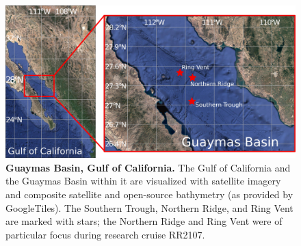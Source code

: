 \begin{figure}[!ht]
  \centering
  \includegraphics[width=\columnwidth]{figures/ops_guaymas.png}
  \caption[Guaymas Basin, Gulf of California.]{\textbf{Guaymas Basin, Gulf of California.} The Gulf of California and the Guaymas Basin within it are visualized with satellite imagery and composite satellite and open-source bathymetry (as provided by GoogleTiles). The Southern Trough, Northern Ridge, and Ring Vent are marked with stars; the Northern Ridge and Ring Vent were of particular focus during research cruise RR2107.}
  \label{fig:ops_map}
\end{figure}

